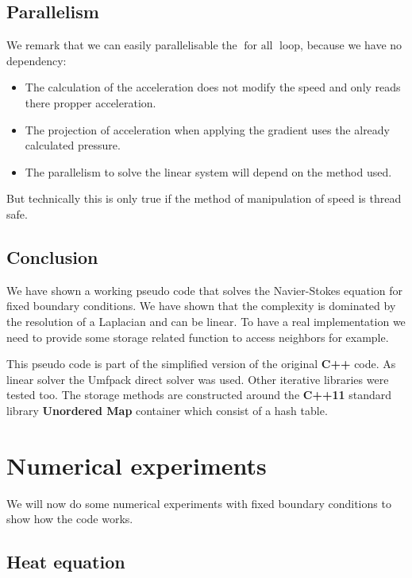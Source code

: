 \subsection{Parallelism}

We remark that we can easily parallelisable the $\mathop{\textbf{for all}}$ loop, because we have no dependency:
\begin{itemize}
 \item The calculation of the acceleration does not modify the speed and only reads there propper acceleration.
 \item The projection of acceleration when applying the gradient uses the already calculated pressure.
 \item The parallelism to solve the linear system will depend on the method used.
\end{itemize}

But technically this is only true if the method of manipulation of speed is thread safe.

\subsection{Conclusion}

We have shown a working pseudo code that solves the Navier-Stokes equation for fixed boundary conditions.
We have shown that the complexity is dominated by the resolution of a Laplacian and can be linear.
To have a real implementation we need to provide some storage related function to access neighbors for example.

This pseudo code is part of the simplified version of the original \textbf{C++} code.
As linear solver the Umfpack direct solver was used. Other iterative libraries were tested too.
The storage methods are constructed around the \textbf{C++11} standard library \textbf{Unordered Map} container which consist of a hash table.

\FloatBarrier
\section{Numerical experiments}

We will now do some numerical experiments with fixed boundary conditions to show how the code works.

\subsection{Heat equation}

